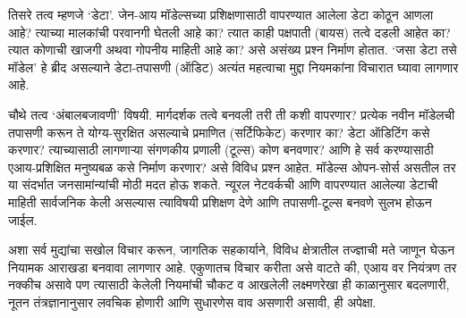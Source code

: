 तिसरे तत्व म्हणजे `डेटा'. जेन-आय मॉडेल्सच्या प्रशिक्षणासाठी वापरण्यात आलेला डेटा कोठून आणला आहे? त्याच्या मालकांची परवानगी घेतली आहे का? त्यात काही पक्षपाती (बायस) तत्वे दडली आहेत का? त्यात कोणाची खाजगी अथवा गोपनीय माहिती आहे का? असे असंख्य प्रश्न निर्माण होतात. `जसा डेटा तसे मॉडेल' हे ब्रीद असल्याने डेटा-तपासणी (ऑडिट) अत्यंत महत्वाचा मुद्दा नियमकांना विचारात घ्यावा लागणार आहे.

चौथे तत्व `अंबालबजावणी' विषयी. मार्गदर्शक तत्वे बनवली तरी ती कशी वापरणार? प्रत्येक नवीन मॉडेलची तपासणी करून ते योग्य-सुरक्षित असल्याचे प्रमाणित (सर्टिफिकेट) करणार का? डेटा ऑडिटिंग कसे करणार? त्याच्यासाठी लागणाऱ्या संगणकीय प्रणाली (टूल्स) कोण बनवणार? आणि हे सर्व करण्यासाठी एआय-प्रशिक्षित मनुष्यबळ कसे निर्माण करणार? असे विविध प्रश्न आहेत. मॉडेल्स ओपन-सोर्स असतील तर या संदर्भात जनसामांन्यांची मोठी मदत होऊ शकते. न्यूरल नेटवर्कची आणि वापरण्यात आलेल्या डेटाची माहिती सार्वजनिक केली असल्यास त्याविषयी प्रशिक्षण देणे आणि तपासणी-टूल्स बनवणे सुलभ होऊन जाईल.

अशा सर्व मुद्यांचा सखोल विचार करून, जागतिक सहकार्याने, विविध क्षेत्रातील तज्ज्ञाची मते जाणून घेऊन नियामक आराखडा बनवावा लागणार आहे. एकुणातच विचार करीता असे वाटते की, एआय वर नियंत्रण तर नक्कीच असावे पण त्यासाठी केलेली नियमांची चौकट व आखलेली लक्ष्मणरेखा ही काळानुसार बदलणारी, नूतन तंत्रज्ञानानुसार लवचिक होणारी आणि सुधारणेस वाव असणारी असावी, ही अपेक्षा.